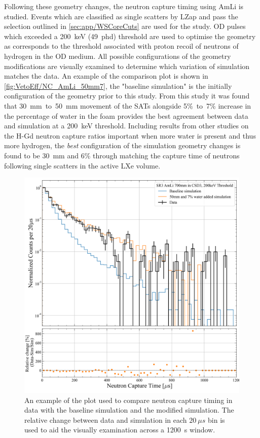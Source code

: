 Following these geometry changes, the neutron capture timing using AmLi is studied. Events which are classified as single scatters by LZap and pass the selection outlined in \autoref{sec:app/WSCoreCuts} are used for the study. OD pulses which exceeded a 200~keV (49~phd) threshold are used to optimise the geometry as corresponds to the threshold associated with proton recoil of neutrons of hydrogen in the OD medium.
All possible configurations of the geometry modifications are visually examined to determine which variation of simulation matches the data. An example of the comparison plot is shown in \autoref{fig:VetoEff/NC_AmLi_50mm7}, the "baseline simulation" is the initially configuration of the geometry prior to this study. %
From this study it was found that 30~mm~to~50~mm movement of the SATs alongside 5\%~to~7\% increase in the percentage of water in the foam provides the best agreement between data and simulation at a 200~keV threshold. Including results from other studies on the H-Gd neutron capture ratios important when more water is present and thus more hydrogen, the \textit{best} configuration of the simulation geometry changes is found to be 30~mm and 6\% through matching the capture time of neutrons following single scatters in the active LXe volume.
\begin{figure}[!ht]
	\centering
	\includegraphics[width=0.7\linewidth]{figures/VetoEfficiency/movedSAT50mm_7percentWater_AmLi_CSD3_Z700mm_200keV_Ratio.png}
	\caption{An example of the plot used to compare neutron capture timing in data with the baseline simulation and the modified simulation. The relative change between data and simulation in each $20~\mu s$ bin is used to aid the visually examination across a 1200~\textmu s window.}
	\label{fig:VetoEff/NC_AmLi_50mm7}
\end{figure}

